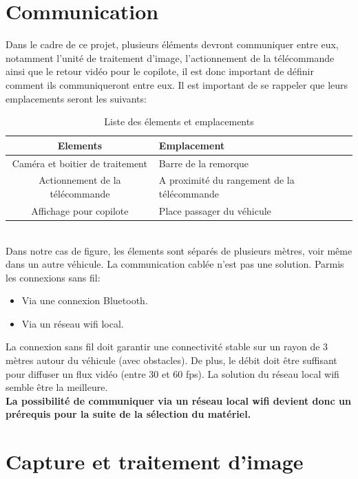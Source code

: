\section{Communication}
Dans le cadre de ce projet, plusieurs éléments devront communiquer entre eux, notamment l'unité de traitement d'image,
l'actionnement de la télécommande ainsi que le retour vidéo pour le copilote, il est donc important de définir comment ils communiqueront entre eux.
Il est important de se rappeler que leurs emplacements seront les suivants:\\
\begin{table}[h]
    \begin{center}
        \caption{Liste des élements et emplacements}
        \begin{tabular}{|c|l|}
            Elements                        & Emplacement                                 \\ \hline
            Caméra et boitier de traitement & Barre de la remorque                        \\
            Actionnement de la télécommande & A proximité du rangement de la télécommande \\
            Affichage pour copilote         & Place passager du véhicule
        \end{tabular}
    \end{center}
\end{table}\\
Dans notre cas de figure, les élements sont séparés de plusieurs mètres, voir même dans un autre véhicule. La communication cablée n'est pas une solution.
Parmis les connexions sans fil:
\begin{itemize}
    \item Via une connexion Bluetooth.
    \item Via un réseau \Gls{wifi} local.
\end{itemize}
La connexion sans fil doit garantir une connectivité stable sur un rayon de 3 mètres autour du véhicule (avec obstacles). De plus, le débit doit être
suffisant pour diffuser un flux vidéo (entre 30 et 60 \Gls{fps}). La solution du réseau local \Gls{wifi} semble être la meilleure.\\
\textbf{La possibilité de communiquer via un réseau local \Gls{wifi} devient donc un prérequis pour la suite de la sélection du matériel.}
\section{Capture et traitement d'image}
